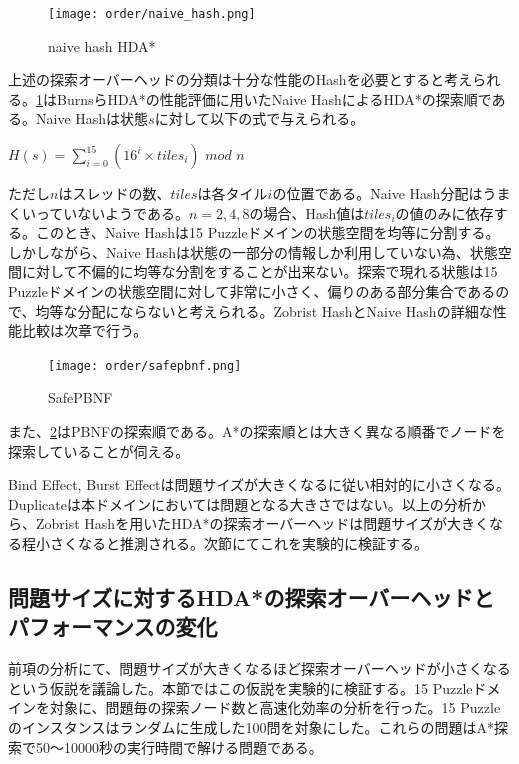 \documentclass{jsarticle}
\begin{document}
\begin{figure}
	\centering
	\texttt{[image: order/naive\_hash.png]}
	\label{fig:order:naive_hash}
	\caption{naive hash HDA*}
\end{figure}

上述の探索オーバーヘッドの分類は十分な性能のHashを必要とすると考えられる。\ref{fig:order:naive_hash}はBurnsらHDA*の性能評価に用いたNaive HashによるHDA*の探索順である。Naive Hashは状態$s$に対して以下の式で与えられる。

$H(s) = \sum\nolimits_{i = 0}^{15}(16^{i} \times tiles_{i})$ $mod$ $n$

ただし$n$はスレッドの数、$tiles$は各タイル$i$の位置である。Naive Hash分配はうまくいっていないようである。$n = 2, 4, 8$の場合、Hash値は$tiles_{i}$の値のみに依存する。このとき、Naive Hashは15 Puzzleドメインの状態空間を均等に分割する。しかしながら、Naive Hashは状態の一部分の情報しか利用していない為、状態空間に対して不偏的に均等な分割をすることが出来ない。探索で現れる状態は15 Puzzleドメインの状態空間に対して非常に小さく、偏りのある部分集合であるので、均等な分配にならないと考えられる。Zobrist HashとNaive Hashの詳細な性能比較は次章で行う。

\begin{figure}
	\centering
	\texttt{[image: order/safepbnf.png]}
	\label{fig:order:safepbnf}
	\caption{SafePBNF}
\end{figure}


また、\ref{fig:order:safepbnf}はPBNFの探索順である。A*の探索順とは大きく異なる順番でノードを探索していることが伺える。
\newline

Bind Effect, Burst Effectは問題サイズが大きくなるに従い相対的に小さくなる。Duplicateは本ドメインにおいては問題となる大きさではない。以上の分析から、Zobrist Hashを用いたHDA*の探索オーバーヘッドは問題サイズが大きくなる程小さくなると推測される。次節にてこれを実験的に検証する。

\subsection{問題サイズに対するHDA*の探索オーバーヘッドとパフォーマンスの変化}
\label{sec:speedup_size}

前項の分析にて、問題サイズが大きくなるほど探索オーバーヘッドが小さくなるという仮説を議論した。本節ではこの仮説を実験的に検証する。15 Puzzleドメインを対象に、問題毎の探索ノード数と高速化効率の分析を行った。15 Puzzleのインスタンスはランダムに生成した100問を対象にした。これらの問題はA*探索で50～10000秒の実行時間で解ける問題である。
\end{document}
